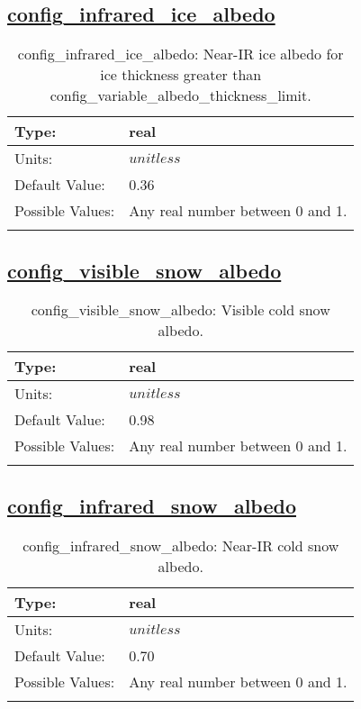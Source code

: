 \subsection[config\_infrared\_ice\_albedo]{\hyperref[sec:nm_tab_shortwave]{config\_infrared\_ice\_albedo}}
\label{subsec:nm_sec_config_infrared_ice_albedo}
\begin{center}
\begin{longtable}{| p{2.0in} || p{4.0in} |}
    \hline
    Type: & real \\
    \hline
    Units: & $unitless$ \\
    \hline
    Default Value: & 0.36 \\
    \hline
    Possible Values: & Any real number between 0 and 1. \\
    \hline
    \caption{config\_infrared\_ice\_albedo: Near-IR ice albedo for ice thickness greater than config\_variable\_albedo\_thickness\_limit.}
\end{longtable}
\end{center}
\subsection[config\_visible\_snow\_albedo]{\hyperref[sec:nm_tab_shortwave]{config\_visible\_snow\_albedo}}
\label{subsec:nm_sec_config_visible_snow_albedo}
\begin{center}
\begin{longtable}{| p{2.0in} || p{4.0in} |}
    \hline
    Type: & real \\
    \hline
    Units: & $unitless$ \\
    \hline
    Default Value: & 0.98 \\
    \hline
    Possible Values: & Any real number between 0 and 1. \\
    \hline
    \caption{config\_visible\_snow\_albedo: Visible cold snow albedo.}
\end{longtable}
\end{center}
\subsection[config\_infrared\_snow\_albedo]{\hyperref[sec:nm_tab_shortwave]{config\_infrared\_snow\_albedo}}
\label{subsec:nm_sec_config_infrared_snow_albedo}
\begin{center}
\begin{longtable}{| p{2.0in} || p{4.0in} |}
    \hline
    Type: & real \\
    \hline
    Units: & $unitless$ \\
    \hline
    Default Value: & 0.70 \\
    \hline
    Possible Values: & Any real number between 0 and 1. \\
    \hline
    \caption{config\_infrared\_snow\_albedo: Near-IR cold snow albedo.}
\end{longtable}
\end{center}
